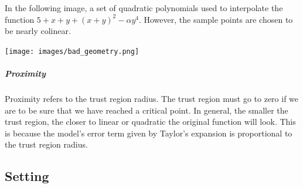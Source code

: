 \documentclass{article}
\let\oldref\ref
\renewcommand{\ref}[1]{(\oldref{#1})}
\begin{document}
In the following image, a set of quadratic polynomials used to interpolate the function $5 + x + y + (x + y) ^ 2 - \alpha y ^ 4$.
However, the sample points are chosen to be nearly colinear.

\texttt{[image: images/bad\_geometry.png]}



\subparagraph{Proximity}

Proximity refers to the trust region radius.
The trust region must go to zero if we are to be sure that we have reached a critical point.
In general, the smaller the trust region, the closer to linear or quadratic the original function will look.
This is because the model's error term given by Taylor's expansion is proportional to the trust region radius.




%



\subsection{Setting}
\end{document}
